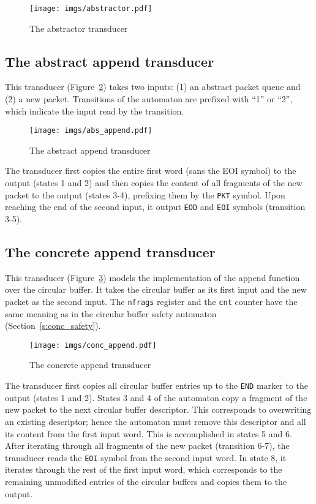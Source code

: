 \documentclass{article}
\begin{document}
\begin{figure}[t]
    \center
    \texttt{[image: imgs/abstractor.pdf]}
    \caption{The abstractor transducer}\label{f:abstractor}
\end{figure}


\subsection{The abstract append transducer}
 
This transducer (Figure~\ref{f:abs_append}) takes two inputs: (1) 
an abstract packet queue and (2) a new packet.  Transitions of the 
automaton are prefixed with ``1'' or ``2'', which indicate the 
input read by the transition.

\begin{figure}[t]
    \center
    \texttt{[image: imgs/abs\_append.pdf]}
    \caption{The abstract append transducer}\label{f:abs_append}
\end{figure}


The transducer first copies the entire first word (sans the EOI 
symbol) to the output (states 1 and 2) and then copies the content 
of all fragments of the new packet to the output (states 3-4), 
prefixing them by the \texttt{PKT} symbol.  Upon reaching the end 
of the second input, it output \texttt{EOD} and \texttt{EOI} 
symbols (transition 3-5).

\subsection{The concrete append transducer}

This transducer (Figure~\ref{f:conc_append}) models the 
implementation of the append function over the circular buffer.  
It takes the circular buffer as its first input and the new packet 
as the second input.  The \texttt{nfrags} register and the 
\texttt{cnt} counter have the same meaning as in the circular 
buffer safety automaton (Section~\ref{s:conc_safety}).

\begin{figure}[t]
    \center
    \texttt{[image: imgs/conc\_append.pdf]}
    \caption{The concrete append transducer}\label{f:conc_append}
\end{figure}

The transducer first copies all circular buffer entries up to the 
\texttt{END} marker to the output (states 1 and 2).  States 3 and 
4 of the automaton copy a fragment of the new packet to the next 
circular buffer descriptor.  This corresponds to overwriting an 
existing descriptor; hence the automaton must remove this 
descriptor and all its content from the first input word.  This is 
accomplished in states 5 and 6.  After iterating through all 
fragments of the new packet (transition 6-7), the transducer reads 
the \texttt{EOI} symbol from the second input word.  In state 8, 
it iterates through the rest of the first input word, which 
corresponds to the remaining unmodified entries of the circular 
buffers and copies them to the output.  
\end{document}
